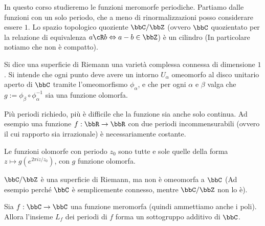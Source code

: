 
In questo corso studieremo le funzioni meromorfe periodiche.  Partiamo dalle funzioni con un solo periodo, che a meno di rinormalizzazioni posso considerare essere $1$.  Lo spazio topologico quoziente $\bbC / \bbZ$ (ovvero $\bbC$ quozientato per la relazione di equivalenza $a \cR b \sse a - b \in \bbZ$) è un cilindro (In particolare notiamo che non è compatto).

\begin{definizione}
  Si dice una superficie di Riemann una varietà complessa connessa di dimensione $1$.  Si intende che ogni punto deve avere un intorno $U_\alpha$ omeomorfo al disco unitario aperto di $\bbC$ tramite l'omeomorfismo $\phi_\alpha$, e che per ogni $\alpha$ e $\beta$ valga che $g := \phi_\beta \circ \phi_\alpha^{-1}$ sia una funzione olomorfa.
\end{definizione}


\begin{osservazione}
  Più periodi richiedo, più è difficile che la funzione sia anche solo continua. Ad esempio una funzione $f: \bbR \rar \bbR$ con due periodi incommensurabili (ovvero il cui rapporto sia irrazionale) è necessariamente costante.
\end{osservazione}

\begin{esercizio}
  Le funzioni olomorfe con periodo $z_0$ sono tutte e sole quelle della
  forma $z \mapsto g(e^{2\pi i z/z_0})$, con $g$ funzione olomorfa.
\end{esercizio}

\begin{osservazione}
  $\bbC / \bbZ$ è una superficie di Riemann, ma non è omeomorfa a $\bbC$ (Ad esempio perché $\bbC$ è semplicemente connesso, mentre $\bbC / \bbZ$ non lo è).
\end{osservazione}

\begin{lemma}
  Sia $f: \bbC \rar \bbC$ una funzione meromorfa (quindi ammettiamo anche i poli).  Allora l'insieme $L_f$ dei periodi di $f$ forma un sottogruppo additivo di $\bbC$.

\end{lemma}

